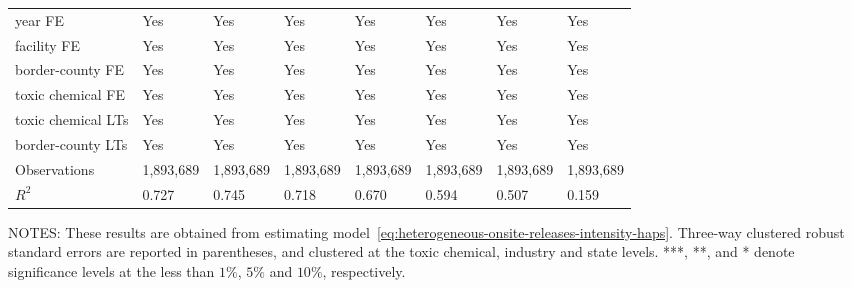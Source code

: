 \begin{table}[H]
{\begin{tabular}{@{}llllllll@{}}
            year FE                         & Yes       & Yes           & Yes       & Yes          & Yes             & Yes           & Yes                 \\
            facility FE                     & Yes       & Yes           & Yes       & Yes          & Yes             & Yes           & Yes                 \\
            border-county FE                & Yes       & Yes           & Yes       & Yes          & Yes             & Yes           & Yes                 \\
            toxic chemical FE               & Yes       & Yes           & Yes       & Yes          & Yes             & Yes           & Yes                 \\
            toxic chemical LTs              & Yes       & Yes           & Yes       & Yes          & Yes             & Yes           & Yes                 \\
            border-county LTs               & Yes       & Yes           & Yes       & Yes          & Yes             & Yes           & Yes                 \\\midrule
            Observations                    & 1,893,689 & 1,893,689     & 1,893,689 & 1,893,689    & 1,893,689       & 1,893,689     & 1,893,689           \\
            $R^2$                           & 0.727     & 0.745         & 0.718     & 0.670        & 0.594           & 0.507         & 0.159               \\ \bottomrule\bottomrule
        \end{tabular}%
    }
    \begin{minipage}{\columnwidth}
        \vspace{0.05in}
        \tiny NOTES: These results are obtained from estimating model~\ref{eq:heterogeneous-onsite-releases-intensity-haps}. Three-way clustered robust standard errors are reported in parentheses, and clustered at the toxic chemical, industry and state levels. ***, **, and * denote significance levels at the less than $1\%$, $5\%$ and $10\%$, respectively.
    \end{minipage}
\end{table}